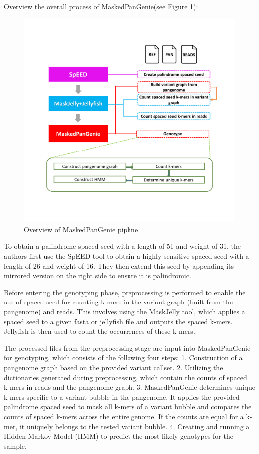 \documentclass{PHlab-thesis}
\begin{document}
Overview the overall process of MaskedPanGenie(see Figure \ref{fig:MaskedPanGenie}):
\begin{figure}
	\centering
	\includegraphics[scale=0.18]{figures/MaskedPanGenie_pipeline.png}
	\caption{Overview of MaskedPanGenie pipline}
	\label{fig:MaskedPanGenie} %
\end{figure}

To obtain a palindrome spaced seed with a length of 51 and weight of 31, the authors first use the SpEED tool to obtain a highly sensitive spaced seed with a length of 26 and weight of 16. They then extend this seed by appending its mirrored version on the right side to ensure it is palindromic.

Before entering the genotyping phase, preprocessing is performed to enable the use of spaced seed for counting k-mers in the variant graph (built from the pangenome) and reads. This involves using the MaskJelly tool, which applies a spaced seed to a given fasta or jellyfish file and outputs the spaced k-mers. Jellyfish is then used to count the occurrences of these k-mers.

The processed files from the preprocessing stage are input into MaskedPanGenie for genotyping, which consists of the following four steps:
1. Construction of a pangenome graph based on the provided variant callset.
2. Utilizing the dictionaries generated during preprocessing, which contain the counts of spaced k-mers in reads and the pangenome graph.
3. MaskedPanGenie determines unique k-mers specific to a variant bubble in the pangenome. It applies the provided palindrome spaced seed to mask all k-mers of a variant bubble and compares the counts of spaced k-mers across the entire genome. If the counts are equal for a k-mer, it uniquely belongs to the tested variant bubble.
4. Creating and running a Hidden Markov Model (HMM) to predict the most likely genotypes for the sample.
\end{document}
